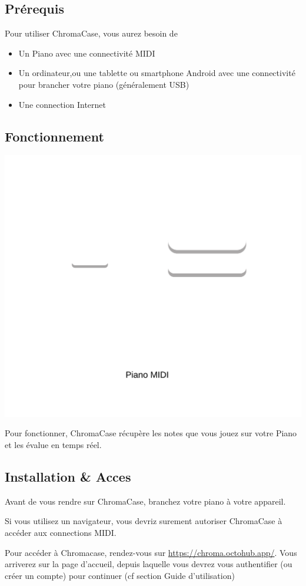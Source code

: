 \subsection{Prérequis}

Pour utiliser ChromaCase, vous aurez besoin de

\begin{itemize}
	\item Un Piano avec une connectivité MIDI
	\item Un ordinateur,ou une tablette ou smartphone Android  avec une connectivité pour brancher votre piano (généralement USB)
	\item Une connection Internet
\end{itemize}


\subsection{Fonctionnement}
\includegraphics[width=\textwidth]{../assets/structure-front.png}

Pour fonctionner, ChromaCase récupère les notes que vous jouez sur votre Piano et les évalue en temps réel. 

\subsection{Installation \& Acces}

Avant de vous rendre sur ChromaCase, branchez votre piano à votre appareil.

Si vous utilisez un navigateur, vous devriz surement autoriser ChromaCase à accéder aux connections MIDI.

Pour accéder à Chromacase, rendez-vous sur \url{https://chroma.octohub.app/}. Vous arriverez sur la page d'accueil, depuis laquelle vous devrez vous authentifier (ou créer un compte) pour continuer (cf section Guide d'utilisation)
